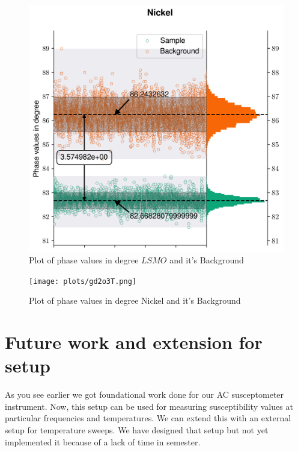 \begin{figure}[hbt!]
  \includegraphics[width= \linewidth]{plots/nickelT.png}
  \caption{Plot of phase values in degree $LSMO$ and it's Background}
  \label{fig:Tdata3}
\end{figure}
\begin{figure}[hbt!]
  \texttt{[image: plots/gd2o3T.png]}
  \caption{Plot of phase values in degree Nickel and it's Background}
  \label{fig:Tdata4}
\end{figure}

\newpage
\section{Future work and extension for setup}

As you see earlier we got foundational work done for our AC susceptometer instrument. Now, this setup can be used for measuring susceptibility values at particular frequencies and temperatures. We can extend this with an external setup for temperature sweeps. We have designed that setup but not yet implemented it because of a lack of time in semester.

